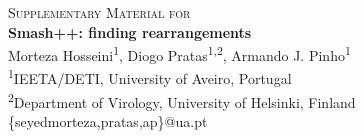 \documentclass[a4paper,9pt]{extarticle}
\begin{document}
\begin{titlepage}
  \centering
  \vspace*{10mm}
  \Large\textsc{Supplementary Material for} \\[5mm]
  \huge\textbf{Smash++: finding rearrangements} \\[12mm]
  \Large Morteza Hosseini\textsuperscript{1}, Diogo Pratas\textsuperscript{1,2}, Armando J. Pinho\textsuperscript{1} \\[6mm]
  \normalsize \textsuperscript{1}IEETA/DETI, University of Aveiro, Portugal \\[1mm]\textsuperscript{2}Department of Virology, University of Helsinki, Finland \\[4mm]
  {\ttfamily\{seyedmorteza,pratas,ap\}@ua.pt}
  
  \vspace{\fill}
  \thispagestyle{empty}
  \raggedright
  \normalsize\tableofcontents
\end{titlepage}


\clearpage
\end{document}
